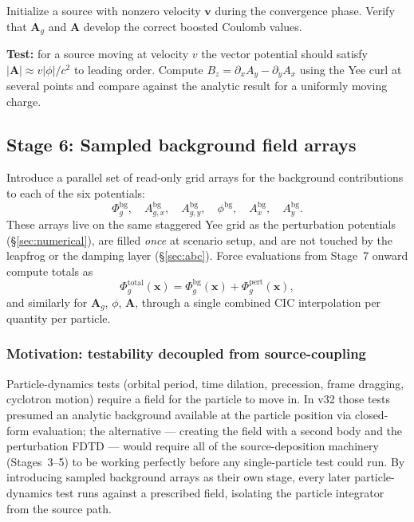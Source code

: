 \documentclass[11pt,a4paper]{article}
\newcommand{\vv}[1]{\mathbf{#1}}
\newcommand{\Phig}{\Phi_g}
\newcommand{\Ag}{\vv{A}_g}
\begin{document}
Initialize a source with nonzero velocity $\vv{v}$ during the convergence phase.  Verify that $\Ag$ and $\vv{A}$ develop the correct boosted Coulomb values.

\textbf{Test:} for a source moving at velocity $v$ the vector potential should satisfy $|\vv{A}| \approx v|\phi|/c^2$ to leading order.  Compute $B_z = \partial_x A_y - \partial_y A_x$ using the Yee curl at several points and compare against the analytic result for a uniformly moving charge.

\subsection{Stage 6: Sampled background field arrays}
\label{sec:stage_bg}

Introduce a parallel set of read-only grid arrays for the background contributions to each of the six potentials:
\[
  \Phig^{\mathrm{bg}}, \quad A_{g,x}^{\mathrm{bg}}, \quad A_{g,y}^{\mathrm{bg}}, \quad \phi^{\mathrm{bg}}, \quad A_x^{\mathrm{bg}}, \quad A_y^{\mathrm{bg}}.
\]
These arrays live on the same staggered Yee grid as the perturbation potentials (§\ref{sec:numerical}), are filled \emph{once} at scenario setup, and are not touched by the leapfrog or the damping layer (§\ref{sec:abc}).  Force evaluations from Stage~7 onward compute totals as
\[
  \Phig^{\mathrm{total}}(\vv{x}) = \Phig^{\mathrm{bg}}(\vv{x}) + \Phig^{\mathrm{pert}}(\vv{x}),
\]
and similarly for $\Ag$, $\phi$, $\vv{A}$, through a single combined CIC interpolation per quantity per particle.

\subsubsection*{Motivation: testability decoupled from source-coupling}

Particle-dynamics tests (orbital period, time dilation, precession, frame dragging, cyclotron motion) require a field for the particle to move in.  In v32 those tests presumed an analytic background available at the particle position via closed-form evaluation; the alternative --- creating the field with a second body and the perturbation FDTD --- would require all of the source-deposition machinery (Stages~3--5) to be working perfectly before any single-particle test could run.  By introducing sampled background arrays as their own stage, every later particle-dynamics test runs against a prescribed field, isolating the particle integrator from the source path.
\end{document}
